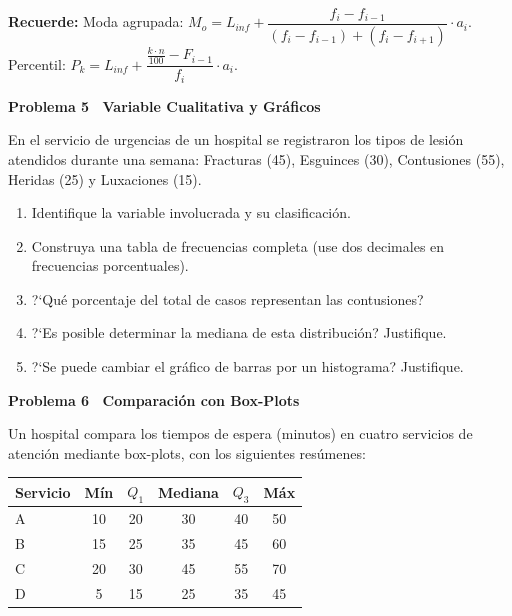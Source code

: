 \documentclass[10pt,letterpaper]{article}
\newcommand{\seccion}[1]{%
  \vspace{2pt}%
  \begin{tcolorbox}[enhanced,colback=white,colframe=black,arc=0pt,boxrule=0pt,
    leftrule=2pt,left=6pt,right=6pt,top=1pt,bottom=1pt]
    {\normalsize\bfseries\sffamily #1}
  \end{tcolorbox}%
  \vspace{1pt}%
}
\newcommand{\reglacaja}[1]{%
  \begin{tcolorbox}[enhanced,colback=white,colframe=black,arc=0pt,boxrule=0.5pt,
    left=6pt,right=6pt,top=2pt,bottom=2pt,breakable]
  \small\sffamily #1
  \end{tcolorbox}%
}
\begin{document}
\reglacaja{%
\textbf{Recuerde:} Moda agrupada: $M_o = L_{inf} + \dfrac{f_i - f_{i-1}}{(f_i-f_{i-1})+(f_i-f_{i+1})}\cdot a_i$.\quad
Percentil: $P_k = L_{inf} + \dfrac{\frac{k\cdot n}{100}-F_{i-1}}{f_i}\cdot a_i$.%
}

\seccion{Problema 5 \textendash\ Variable Cualitativa y Gr\'aficos}

\noindent\sffamily\small En el servicio de urgencias de un hospital se registraron los tipos de lesi\'on atendidos durante una semana: Fracturas (45), Esguinces (30), Contusiones (55), Heridas (25) y Luxaciones (15).

\begin{enumerate}[leftmargin=1.2cm, label=\textbf{\alph*)}, itemsep=2pt, topsep=2pt]
  \item Identifique la variable involucrada y su clasificaci\'on.
  \item Construya una tabla de frecuencias completa (use dos decimales en frecuencias porcentuales).
  \item ?`Qu\'e porcentaje del total de casos representan las contusiones?
  \item ?`Es posible determinar la mediana de esta distribuci\'on? Justifique.
  \item ?`Se puede cambiar el gr\'afico de barras por un histograma? Justifique.
\end{enumerate}

\seccion{Problema 6 \textendash\ Comparaci\'on con Box-Plots}

\noindent\sffamily\small Un hospital compara los tiempos de espera (minutos) en cuatro servicios de atenci\'on mediante box-plots, con los siguientes res\'umenes:

\vspace{4pt}
\begin{center}
\small\sffamily
\begin{tabular}{|l|c|c|c|c|c|}
\hline
\textbf{Servicio} & \textbf{M\'in} & $Q_1$ & \textbf{Mediana} & $Q_3$ & \textbf{M\'ax} \\
\hline
A & 10 & 20 & 30 & 40 & 50 \\
\hline
B & 15 & 25 & 35 & 45 & 60 \\
\hline
C & 20 & 30 & 45 & 55 & 70 \\
\hline
D & 5  & 15 & 25 & 35 & 45 \\
\hline
\end{tabular}
\end{center}
\vspace{4pt}
\end{document}
